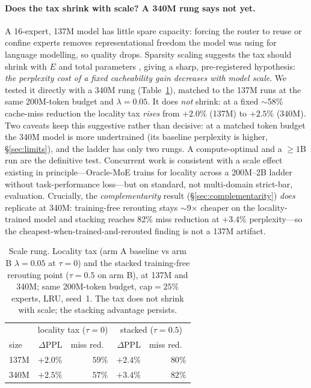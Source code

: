 \documentclass[11pt]{article}
\begin{document}
\paragraph{Does the tax shrink with scale? A 340M rung says not yet.}
A 16-expert, 137M model has little spare capacity: forcing the router to reuse or
confine experts removes representational freedom the model was using for language
modelling, so quality drops. Sparsity scaling suggests the tax should shrink with
$E$ and total parameters \citep{dai2024deepseekmoe,deepseekai2024deepseekv3}, giving
a sharp, pre-registered hypothesis: \emph{the perplexity cost of a fixed cacheability
gain decreases with model scale}. We tested it directly with a 340M rung
(Table~\ref{tab:scale}), matched to the 137M runs at the same 200M-token budget and
$\lambda{=}0.05$. It does \emph{not} shrink: at a fixed $\sim$58\% cache-miss
reduction the locality tax \emph{rises} from $+2.0\%$ (137M) to $+2.5\%$ (340M). Two
caveats keep this suggestive rather than decisive: at a matched token budget the 340M
model is more undertrained (its baseline perplexity is higher, \S\ref{sec:limits}),
and the ladder has only two rungs. A compute-optimal and a $\ge\!1$B run are the
definitive test. Concurrent work is consistent with a scale effect existing in
principle---Oracle-MoE \citep{zhou2025oraclemoe} trains for locality across a
200M--2B ladder without task-performance loss---but on standard, not multi-domain
strict-bar, evaluation. Crucially, the \emph{complementarity} result
(\S\ref{sec:complementarity}) \emph{does} replicate at 340M: training-free rerouting
stays $\sim$9$\times$ cheaper on the locality-trained model and stacking reaches
82\% miss reduction at $+3.4\%$ perplexity---so the cheapest-when-trained-and-rerouted
finding is not a 137M artifact.

\begin{table}[t]\centering
\caption{Scale rung. Locality tax (arm A baseline vs arm B $\lambda{=}0.05$ at
$\tau{=}0$) and the stacked training-free rerouting point ($\tau{=}0.5$ on arm B), at
137M and 340M; same 200M-token budget, cap${=}25\%$ experts, LRU, seed~1. The tax
does not shrink with scale; the stacking advantage persists.}
\label{tab:scale}
\small
\begin{tabular}{lrrrr}
\toprule
 & \multicolumn{2}{c}{locality tax ($\tau{=}0$)} & \multicolumn{2}{c}{stacked ($\tau{=}0.5$)} \\
size & $\Delta$PPL & miss red.\ & $\Delta$PPL & miss red.\ \\
\midrule
137M & $+2.0\%$ & $59\%$ & $+2.4\%$ & $80\%$ \\
340M & $+2.5\%$ & $57\%$ & $+3.4\%$ & $82\%$ \\
\bottomrule
\end{tabular}
\end{table}
\end{document}
